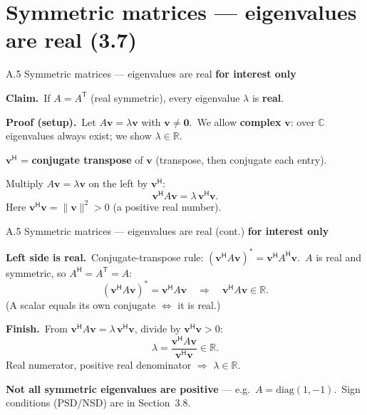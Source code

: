 \documentclass[11pt,aspectratio=169]{beamer}
\newcommand{\InterestOnly}{\textcolor{mAccent}{\textbf{for interest only}}}
\begin{document}
\section{Symmetric matrices --- eigenvalues are real (3.7)}

\begin{frame}{A.5 Symmetric matrices --- eigenvalues are real}
  \hypertarget{sec:symmetric-real-eigenvalues}{}
  \footnotesize
  \InterestOnly

  \medskip
  \textbf{Claim.}\
  If $A=A^{\mathsf T}$ (real symmetric), every eigenvalue $\lambda$ is \textbf{real}.

  \medskip
  \textbf{Proof (setup).}\
  Let $A\mathbf{v}=\lambda\mathbf{v}$ with $\mathbf{v}\neq\mathbf{0}$.\
  We allow \textbf{complex} $\mathbf{v}$: over $\mathbb{C}$ eigenvalues always exist; we show $\lambda\in\mathbb{R}$.

  \medskip
  $\mathbf{v}^{\mathsf H}$ = \textbf{conjugate transpose} of $\mathbf{v}$ (transpose, then conjugate each entry).

  \medskip
  Multiply $A\mathbf{v}=\lambda\mathbf{v}$ on the left by $\mathbf{v}^{\mathsf H}$:
  \[
    \mathbf{v}^{\mathsf H}A\mathbf{v}=\lambda\,\mathbf{v}^{\mathsf H}\mathbf{v}.
  \]
  Here $\mathbf{v}^{\mathsf H}\mathbf{v}=\|\mathbf{v}\|^2>0$ (a positive real number).
\end{frame}

\begin{frame}{A.5 Symmetric matrices --- eigenvalues are real (cont.)}
  \footnotesize
  \InterestOnly

  \medskip
  \textbf{Left side is real.}\
  Conjugate-transpose rule: $(\mathbf{v}^{\mathsf H}A\mathbf{v})^*=\mathbf{v}^{\mathsf H}A^{\mathsf H}\mathbf{v}$.\
  $A$ is real and symmetric, so $A^{\mathsf H}=A^{\mathsf T}=A$:
  \[
    (\mathbf{v}^{\mathsf H}A\mathbf{v})^*=\mathbf{v}^{\mathsf H}A\mathbf{v}
    \quad\Longrightarrow\quad
    \mathbf{v}^{\mathsf H}A\mathbf{v}\in\mathbb{R}.
  \]
  (A scalar equals its own conjugate $\Leftrightarrow$ it is real.)

  \medskip
  \textbf{Finish.}\
  From $\mathbf{v}^{\mathsf H}A\mathbf{v}=\lambda\,\mathbf{v}^{\mathsf H}\mathbf{v}$, divide by $\mathbf{v}^{\mathsf H}\mathbf{v}>0$:
  \[
    \lambda=\frac{\mathbf{v}^{\mathsf H}A\mathbf{v}}{\mathbf{v}^{\mathsf H}\mathbf{v}}
    \in\mathbb{R}.
  \]
  Real numerator, positive real denominator $\Rightarrow$ $\lambda\in\mathbb{R}$.

  \medskip
  {\scriptsize \textbf{Not all symmetric eigenvalues are positive} --- e.g.\ $A=\mathrm{diag}(1,-1)$.\
  Sign conditions (PSD/NSD) are in Section~3.8.}
\end{frame}
\end{document}
